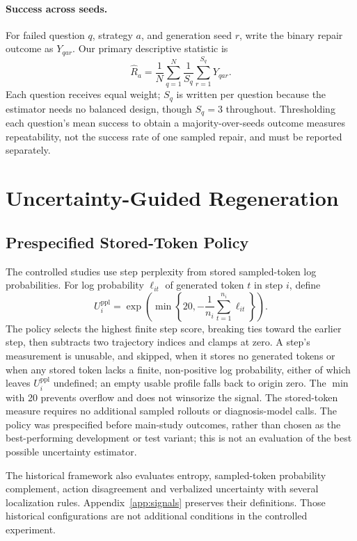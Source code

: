 \documentclass{article}
\begin{document}
\paragraph{Success across seeds.}
For failed question $q$, strategy $a$, and generation seed $r$, write the
binary repair outcome as $Y_{qar}$. Our primary descriptive statistic is
\begin{equation}
  \widehat{R}_a = \frac{1}{N}\sum_{q=1}^{N}
                 \frac{1}{S_q}\sum_{r=1}^{S_q}Y_{qar}.
  \label{eq:success}
\end{equation}
Each question receives equal weight; $S_q$ is written per question because the
estimator needs no balanced design, though $S_q=3$ throughout.
Thresholding each question's mean
success to obtain a majority-over-seeds outcome measures repeatability,
not the success rate of one sampled repair, and must be reported separately.

\section{Uncertainty-Guided Regeneration}
\subsection{Prespecified Stored-Token Policy}\label{sec:policy}
The controlled studies use step perplexity from stored sampled-token log
probabilities. For log probability $\ell_{it}$ of generated token $t$ in
step $i$, define
\begin{equation}
 U_i^{\mathrm{ppl}}=\exp\!\left(\min\left\{20,
                  -\frac{1}{n_i}\sum_{t=1}^{n_i}\ell_{it}\right\}\right).
\end{equation}
The policy selects the highest finite step score, breaking ties toward
the earlier step, then subtracts two trajectory indices and clamps at zero.
A step's measurement is unusable, and skipped, when it stores no generated
tokens or when any stored token lacks a finite, non-positive log probability,
either of which leaves $U_i^{\mathrm{ppl}}$ undefined; an empty usable profile
falls back to origin zero. The $\min$ with 20 prevents overflow and does not
winsorize the signal. The stored-token measure requires no additional sampled
rollouts or diagnosis-model calls. The policy was prespecified before main-study outcomes, rather than
chosen as the best-performing development or test variant; this is not an
evaluation of the best possible uncertainty estimator.

The historical framework also evaluates entropy, sampled-token probability
complement, action disagreement and verbalized uncertainty with several
localization rules. Appendix~\ref{app:signals} preserves their definitions.
Those historical configurations are not additional conditions in the
controlled experiment.
\end{document}
